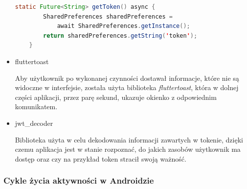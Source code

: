 \documentclass[twoside]{projektInzynierskiMS}
\numberwithin{figure}{section}
\begin{document}
\begin{itemize}
    \begin{lstlisting}[language=Java,caption=Implementacja sposobu odczytywania tokenu. Źródło: Opracowanie własne.,captionpos=b]
    static Future<String> getToken() async {
        SharedPreferences sharedPreferences =  
            await SharedPreferences.getInstance();
        return sharedPreferences.getString('token');
    }
    \end{lstlisting}
    \item fluttertoast
    
    Aby użytkownik po wykonanej czynności dostawał informacje, które nie są widoczne w interfejsie, została użyta biblioteka \textit{fluttertoast}, która w dolnej części aplikacji, przez parę sekund, ukazuje okienko z odpowiednim komunikatem.
    
    \item jwt\_decoder
    
    Biblioteka użyta w celu dekodowania informacji zawartych w tokenie, dzięki czemu aplikacja jest w stanie rozpoznać, do jakich zasobów użytkownik ma dostęp oraz czy na przykład token stracił swoją ważność. 
\end{itemize}

\subsubsection{Cykle życia aktywności w Androidzie}
\end{document}
